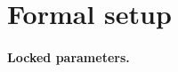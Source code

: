 \documentclass[11pt]{article}
\newcommand{\E}{\mathbb{E}}
\theoremstyle{definition}
\theoremstyle{plain}
\theoremstyle{remark}
\begin{document}
\section{Formal setup}

\paragraph{Locked parameters.}
%
%
\end{document}
